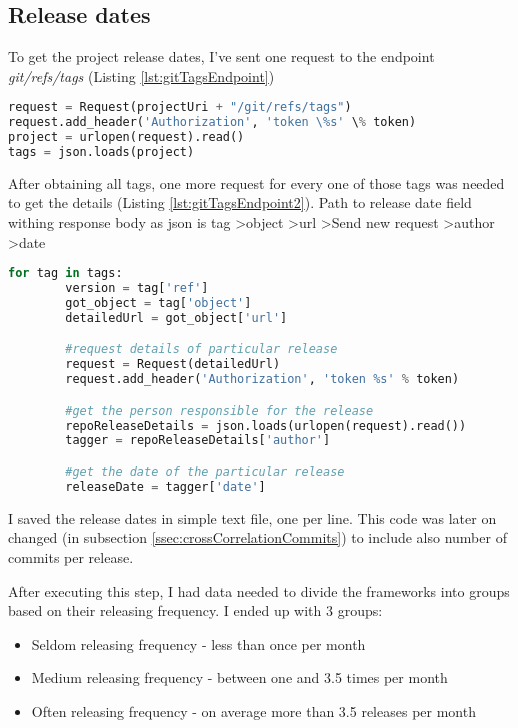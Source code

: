 \subsection{Release dates} \label{ssec:gitReleaseDatesMining}
To get the project release dates, I've sent one request to the endpoint \textit{git/refs/tags} (Listing \ref{lst:gitTagsEndpoint})

\begin{lstlisting}[caption={Requesting all project tags git api tags endpoint},label={lst:gitTagsEndpoint},language=Python]
request = Request(projectUri + "/git/refs/tags")
request.add_header('Authorization', 'token \%s' \% token)
project = urlopen(request).read()
tags = json.loads(project)
\end{lstlisting}

After obtaining all tags, one more request for every one of those tags was needed to get the details (Listing \ref{lst:gitTagsEndpoint2}). Path to release date field withing response body as json is tag \textgreater  object \textgreater  url \textgreater  Send new request \textgreater  author \textgreater  date

\begin{lstlisting}[caption={Requesting tag details and accessing release date},label={lst:gitTagsEndpoint2},language=Python]
	for tag in tags:
		version = tag['ref']
		got_object = tag['object']
		detailedUrl = got_object['url']

		#request details of particular release
		request = Request(detailedUrl)
		request.add_header('Authorization', 'token %s' % token)

		#get the person responsible for the release
		repoReleaseDetails = json.loads(urlopen(request).read())
		tagger = repoReleaseDetails['author']

		#get the date of the particular release
		releaseDate = tagger['date']
\end{lstlisting}

I saved the release dates in simple text file, one per line. This code was later on changed (in subsection \ref{ssec:crossCorrelationCommits}) to include also number of commits per release.

After executing this step, I had data needed to divide the frameworks into groups based on their releasing frequency. I ended up with 3 groups:
\begin{itemize}
\item{Seldom releasing frequency} - less than once per month
\item{Medium releasing frequency} - between one and 3.5 times per month
\item{Often releasing frequency} - on average more than 3.5 releases per month
\end{itemize}

